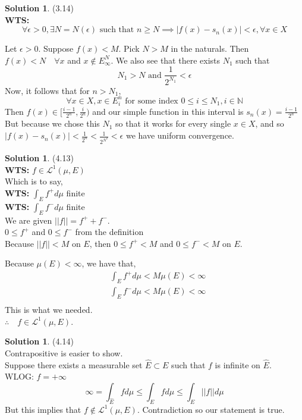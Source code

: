 \documentclass[letterpaper,12pt]{article}
\theoremstyle{definition}
\newtheorem{solution}[theorem]{Solution}
\begin{document}
\begin{solution}{(3.14)} \\
\textbf{WTS:}
$$ \forall \epsilon > 0, \exists N=N(\epsilon) \text{ such that } n \geq N \implies |f(x)-s_n(x)| < \epsilon, \forall x \in X$$

Let $\epsilon > 0$. Suppose $f(x) < M$. Pick $N > M$ in the naturals. Then $f(x) < N \quad \forall x$  and $x \notin E_\infty^{N}$. We also see that there exists $N_1$ such that
$$
N_1 > N \text{ and } \frac{1}{2^{N_1}} < \epsilon
$$
Now, it follows that for $n>N_1$,
$$
\forall x \in X, x \in E_i^n \text{ for some index } 0 \leq i \leq N_1, i \in \mathbb{N}
$$
Then $f(x) \in [\frac{i-1}{2^n}, \frac{i}{2^n}) $ and our simple function in this interval is $s_n(x) = \frac{i-1}{2^n} $ \\
But because we chose this $N_1$ so that it works for every single $x \in X$, and so $|f(x) - s_n(x)| < \frac{1}{2^n} < \frac{1}{2^{N^2}} < \epsilon $ we have uniform convergence.

\end{solution}

\begin{solution}{(4.13)} \\
\textbf{WTS:} $f \in \mathcal{L}^1(\mu, E)$ \\ Which is to say, \\
\textbf{WTS:} $\int_E f^+ d\mu$ finite \\
\textbf{WTS:} $\int_E f^- d\mu$ finite \\

We are given $||f|| = f^+ + f^-$. \\
$0 \leq f^+$ and $0 \leq f^-$ from the definition \\
Because $||f|| < M$ on $E$, then $0 \leq f^+ < M$ and $0 \leq f^- < M$ on $E$.

Because $\mu(E) < \infty$, we have that,
\begin{align*}
  &\int_E f^+ d\mu < M \mu(E) < \infty \\
  &\int_E f^- d\mu < M \mu(E) < \infty \\
\end{align*}
This is what we needed.\\
$\therefore \quad f \in \mathcal{L}^1(\mu, E)$.
\end{solution}

\begin{solution}{(4.14)} \\
Contrapositive is easier to show. \\

Suppose there exists a measurable set $\hat{E} \subset E$ such that $f$ is infinite on $\hat{E}$. \\WLOG: $f = +\infty$
\begin{equation*}
	\infty = \int_{\hat{E}} f d\mu \leq \int_E f d\mu \leq \int_E ||f|| d\mu
\end{equation*}
But this implies that $f \not\in \mathcal{L}^1(\mu,E)$. Contradiction so our statement is true.
\end{solution}
\end{document}
